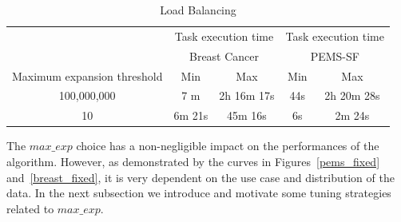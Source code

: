 \begin{table}
\begin{center}
\caption{Load Balancing}
\label{load balance breast}
\begin{tabular}{ |c| c | c| c| c| }
\hline
							    &
\multicolumn{2}{|c|}{Task execution time}    & \multicolumn{2}{|c|}{Task execution time}      \\
 & \multicolumn{2}{|c|}{Breast Cancer}    & \multicolumn{2}{|c|}{PEMS-SF}      \\ \hline \hline
	Maximum expansion threshold &   Min          & Max    &   Min          & Max          \\ \hline
	100,000,000                 &    7 m                      & 2h 16m 17s &    44s                      & 2h 20m 28s
  \\ \hline
10                         &    6m 21s                      &        45m 16s  &   6s                      &        2m 24s
 \\ \hline
\end{tabular}
\end{center}
\end{table}





The $max\_exp$ choice has a non-negligible impact on the performances of the algorithm. However, as demonstrated by the curves in Figures~\ref{pems_fixed} and~\ref{breast_fixed}, it is very dependent on the use case and distribution of the data.
In the next subsection we introduce and motivate some tuning strategies related to $max\_exp$.

